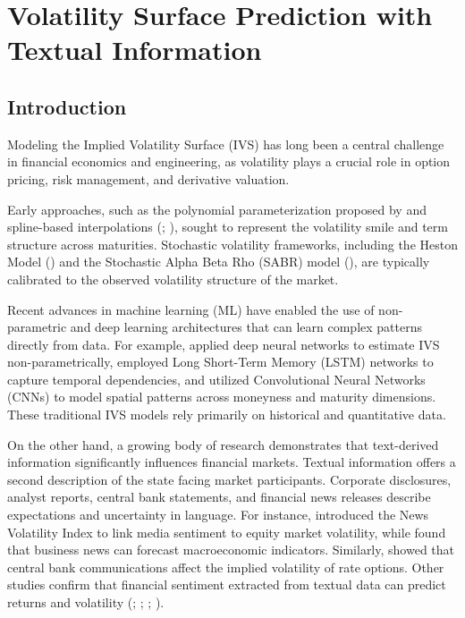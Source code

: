 \graphicspath{{Chapter3/Chapter3Figs/}{Chapter3/Chapter3Figs/}}




\chapter{Volatility Surface Prediction with Textual Information}\label{ch: chapter: vol_surface}

\section{Introduction}\label{sec:ch3: introduction}

Modeling the Implied Volatility Surface (IVS) has long been a central challenge in financial economics and engineering, as volatility plays a crucial role in option pricing, risk management, and derivative valuation. 


Early approaches, such as the polynomial parameterization proposed by \cite{dumas1998implied} and spline-based interpolations (\cite{kahale2004arbitrage}; \cite{wang2004no}), sought to represent the volatility smile and term structure across maturities. Stochastic volatility frameworks, including the Heston Model (\cite{Heston:1993}) and the Stochastic Alpha Beta Rho (SABR) model (\cite{sabr2002}), are typically calibrated to the observed volatility structure of the market.

Recent advances in machine learning (ML) have enabled the use of non-parametric and deep learning architectures that can learn complex patterns directly from data. For example, \cite{ackerer2020deep} applied deep neural networks to estimate IVS non-parametrically, \cite{medvedev2022multistep} employed Long Short-Term Memory (LSTM) networks to capture temporal dependencies, and \cite{kelly2023deep} utilized Convolutional Neural Networks (CNNs) to model spatial patterns across moneyness and maturity dimensions. These traditional IVS models rely primarily on historical and quantitative data. 



On the other hand, a growing body of research demonstrates that text-derived information significantly influences financial markets. Textual information offers a second description of the state facing market participants. Corporate disclosures, analyst reports, central bank statements, and financial news releases describe expectations and uncertainty in language. For instance, \cite{manela2017news} introduced the News Volatility Index to link media sentiment to equity market volatility, while \cite{bybee2024business} found that business news can forecast macroeconomic indicators. Similarly, \cite{vergote2012} showed that central bank communications affect the implied volatility of rate options. Other studies confirm that financial sentiment extracted from textual data can predict returns and volatility (\cite{schumaker2009quantitative}; \cite{hagenau2012automated}; \cite{ke2019predicting}; \cite{li2020incorporating}).




